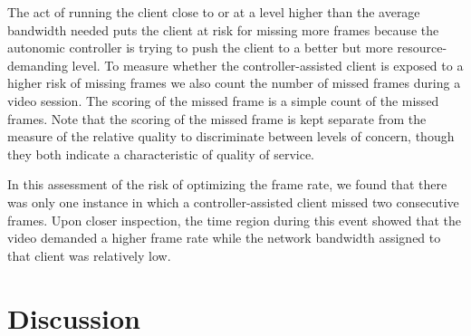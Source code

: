 \documentclass{sig-alternate}
\begin{document}
The act of running the client close to or at a level higher than the
average bandwidth needed puts the client at risk for missing more
frames because the autonomic controller is trying to push the client to
a better but more resource-demanding level.  
To measure whether the controller-assisted client is
exposed to a higher risk of missing frames we also count the number of
missed frames during a video session.  The scoring of the missed frame
is a simple count of the missed frames.  Note that the scoring of the
missed frame is kept separate from the measure of the relative quality
to discriminate between levels of concern, though they both indicate a
characteristic of quality of service.


In this assessment of the risk of optimizing the frame rate, we found
that there was only one instance in which a controller-assisted
client missed two consecutive frames.  Upon closer inspection, the
time region during this event showed that the video demanded a higher
frame rate while the network bandwidth assigned to that client was relatively low.



\section{Discussion} \label{discussion}
\end{document}
